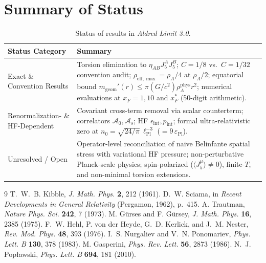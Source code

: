 \documentclass[11pt,a4paper]{article}
\begin{document}
\section{Summary of Status}
\begin{table}[h]
\centering
\begin{tabular}{p{4.3cm}p{9.1cm}}
\toprule
Status Category & Summary \\
\midrule
Exact \& Convention Results & Torsion elimination to $\eta_{AB}J_5^A J_5^B$; $C=1/8$ vs.\ $C=1/32$ convention audit; $\rho_{\mathrm{eff},\max} = \rho_A/4$ at $\rho_A/2$; equatorial bound $m_{\mathrm{geom}}'(r) \le \pi(G/c^2)\rho_A^{\mathrm{phys}}r^2$; numerical evaluations at $x_F=1, 10$ and $x_F^*$ (50-digit arithmetic). \\
Renormalization- \& HF-Dependent & Covariant cross-term removal via scalar counterterm; correlators $\mathcal{A}_0, \mathcal{A}_s$; HF $\epsilon_{\mathrm{int}}, p_{\mathrm{int}}$; formal ultra-relativistic zero at $n_0 = \sqrt{24/\pi}\,\ell_{\mathrm{Pl}}^{-3}$ ($=9\,\varepsilon_{\mathrm{Pl}}$). \\
Unresolved / Open & Operator-level reconciliation of naive Belinfante spatial stress with variational HF pressure; non-perturbative Planck-scale physics; spin-polarized ($\langle J_5^\mu\rangle \neq 0$), finite-$T$, and non-minimal torsion extensions. \\
\bottomrule
\end{tabular}
\caption{Status of results in \emph{Aldred Limit 3.0}.}
\end{table}

\begin{thebibliography}{9}
 T.~W.~B. Kibble, \emph{J. Math. Phys.} \textbf{2}, 212 (1961).
 D.~W. Sciama, in \emph{Recent Developments in General Relativity} (Pergamon, 1962), p.~415.
 A. Trautman, \emph{Nature Phys. Sci.} \textbf{242}, 7 (1973).
 M. G\"urses and F. G\"ursey, \emph{J. Math. Phys.} \textbf{16}, 2385 (1975).
 F.~W. Hehl, P. von der Heyde, G.~D. Kerlick, and J.~M. Nester, \emph{Rev. Mod. Phys.} \textbf{48}, 393 (1976).
 I.~S. Nurgaliev and V.~N. Ponomariev, \emph{Phys. Lett. B} \textbf{130}, 378 (1983).
 M. Gasperini, \emph{Phys. Rev. Lett.} \textbf{56}, 2873 (1986).
 N.~J. Pop\l awski, \emph{Phys. Lett. B} \textbf{694}, 181 (2010).
\end{thebibliography}
\end{document}
